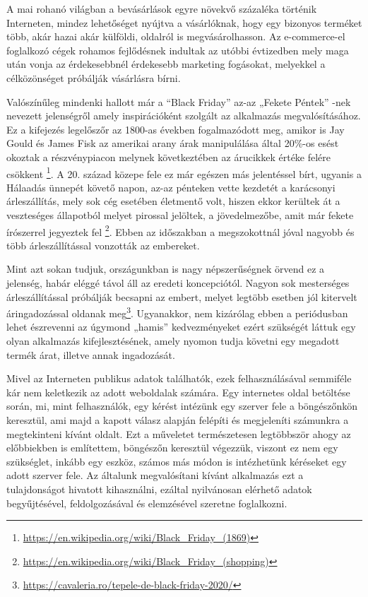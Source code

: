 A mai rohanó világban a bevásárlások egyre növekvő százaléka történik Interneten, mindez lehetőséget nyújtva a vásárlóknak, hogy egy bizonyos terméket több, akár hazai akár külföldi, oldalról is megvásárolhasson. Az e-commerce-el foglalkozó cégek rohamos fejlődésnek indultak az utóbbi évtizedben mely maga után vonja az érdekesebbnél érdekesebb marketing fogásokat, melyekkel a célközönséget próbálják vásárlásra bírni.

Valószínűleg mindenki hallott már a “Black Friday” az-az „Fekete Péntek” -nek nevezett jelenségről amely inspirációként szolgált az alkalmazás megvalósításához. Ez a kifejezés legelőszőr az 1800-as években fogalmazódott meg, amikor is Jay Gould és James Fisk az amerikai arany árak manipulálása által 20\%-os esést okoztak a részvénypiacon melynek következtében az árucikkek értéke felére csökkent \footnote{\url{https://en.wikipedia.org/wiki/Black_Friday_(1869)}}. A 20. század közepe fele ez már egészen más jelentéssel bírt, ugyanis a Hálaadás ünnepét követő napon, az-az pénteken vette kezdetét a karácsonyi árleszállítás, mely sok cég esetében életmentő volt, hiszen ekkor kerültek át a veszteséges állapotból melyet pirossal jelöltek, a jövedelmezőbe, amit már fekete írószerrel jegyeztek fel \footnote{\url{https://en.wikipedia.org/wiki/Black_Friday_(shopping)}}. Ebben az időszakban a megszokottnál jóval nagyobb és több árleszállítással vonzották az embereket.

Mint azt sokan tudjuk, országunkban is nagy népszerűségnek örvend ez a jelenség, habár eléggé távol áll az eredeti koncepciótól. Nagyon sok mesterséges árleszállítással próbálják becsapni az embert, melyet legtöbb esetben jól kitervelt áringadozással oldanak meg\footnote{\url{https://cavaleria.ro/tepele-de-black-friday-2020/}}. Ugyanakkor, nem kizárólag ebben a periódusban lehet észrevenni az úgymond „hamis” kedvezményeket ezért szükségét láttuk egy olyan alkalmazás kifejlesztésének, amely nyomon tudja követni egy megadott termék árat, illetve annak ingadozását.

Mivel az Interneten publikus adatok találhatók, ezek felhasználásával semmiféle kár nem keletkezik az adott weboldalak számára. Egy internetes oldal betöltése során, mi, mint felhasználók, egy kérést intézünk egy szerver fele a böngészőnkön keresztül, ami majd a kapott válasz alapján felépíti és megjeleníti számunkra a megtekinteni kívánt oldalt. Ezt a műveletet természetesen legtöbbször ahogy az előbbiekben is említettem, böngészőn keresztül végezzük, viszont ez nem egy szükséglet, inkább egy eszköz, számos más módon is intézhetünk kéréseket egy adott szerver fele. Az általunk megvalósítani kívánt alkalmazás ezt a tulajdonságot hivatott kihasználni, ezáltal nyilvánosan elérhető adatok begyűjtésével, feldolgozásával és elemzésével szeretne foglalkozni.
